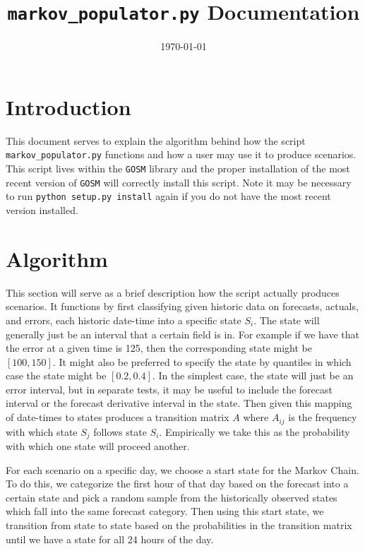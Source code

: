 \documentclass[11pt]{article}
\begin{document}
	\title{\texttt{markov\_populator.py} Documentation}
	\date{\today}
	\maketitle
	
	\section{Introduction}
	This document serves to explain the algorithm behind how the script
	\texttt{markov\_populator.py} functions and how a user may use it to produce
	scenarios.  This script lives within the \texttt{GOSM} library and the
	proper installation of the most recent version of \texttt{GOSM} will 	
	correctly install this script. Note it may be necessary to run
	\texttt{python setup.py install} again if you do not have the most recent
	version installed.
	
	\section{Algorithm}
	This section will serve as a brief description how the script actually
	produces scenarios. It functions by first classifying given historic data on
	forecasts, actuals, and errors, each historic date-time into a specific
	state $S_i$. The state will generally just be an interval that a certain 
	field is in. For example if we have that the error at a given time is 125, 
	then the corresponding state might be $[100, 150]$. It might also be
	preferred to specify the state by quantiles in which case the state might be
	$[0.2,0.4]$. In the simplest case, the state will just be an error interval,
	but in separate tests, it may be useful to include the forecast interval or
	the forecast derivative interval in the state.
	Then given this mapping of date-times to states produces a 
	transition matrix $A$ where $A_{ij}$ is the frequency with which state 
	$S_j$ follows state $S_i$. Empirically we take this as the probability with
	which one state will proceed another. 
	
	For each scenario on a specific day, we choose a start state for the Markov 
	Chain. To do this, we categorize the first hour of that day based on the 
	forecast into a certain state and pick a random sample from the historically
	observed states which fall into the same forecast category. Then using this
	start state, we transition from state to state based on the probabilities in
	the transition matrix until we have a state for all 24 hours of the day.
	
\end{document}
